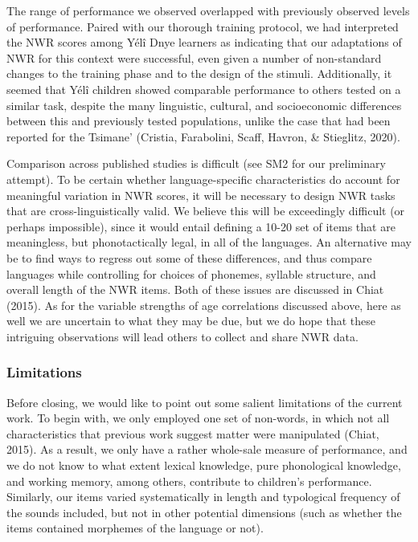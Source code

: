 \documentclass[
  american,
  ,man,floatsintext]{apa6}
\begin{document}
The range of performance we observed overlapped with previously observed levels of performance. Paired with our thorough training protocol, we had interpreted the NWR scores among Yélî Dnye learners as indicating that our adaptations of NWR for this context were successful, even given a number of non-standard changes to the training phase and to the design of the stimuli. Additionally, it seemed that Yélî children showed comparable performance to others tested on a similar task, despite the many linguistic, cultural, and socioeconomic differences between this and previously tested populations, unlike the case that had been reported for the Tsimane' (Cristia, Farabolini, Scaff, Havron, \& Stieglitz, 2020).

Comparison across published studies is difficult (see SM2 for our preliminary attempt). To be certain whether language-specific characteristics do account for meaningful variation in NWR scores, it will be necessary to design NWR tasks that are cross-linguistically valid. We believe this will be exceedingly difficult (or perhaps impossible), since it would entail defining a 10-20 set of items that are meaningless, but phonotactically legal, in all of the languages. An alternative may be to find ways to regress out some of these differences, and thus compare languages while controlling for choices of phonemes, syllable structure, and overall length of the NWR items. Both of these issues are discussed in Chiat (2015). As for the variable strengths of age correlations discussed above, here as well we are uncertain to what they may be due, but we do hope that these intriguing observations will lead others to collect and share NWR data.

\hypertarget{limitations}{%
\subsubsection{Limitations}\label{limitations}}

Before closing, we would like to point out some salient limitations of the current work. To begin with, we only employed one set of non-words, in which not all characteristics that previous work suggest matter were manipulated (Chiat, 2015). As a result, we only have a rather whole-sale measure of performance, and we do not know to what extent lexical knowledge, pure phonological knowledge, and working memory, among others, contribute to children's performance. Similarly, our items varied systematically in length and typological frequency of the sounds included, but not in other potential dimensions (such as whether the items contained morphemes of the language or not).
\end{document}
